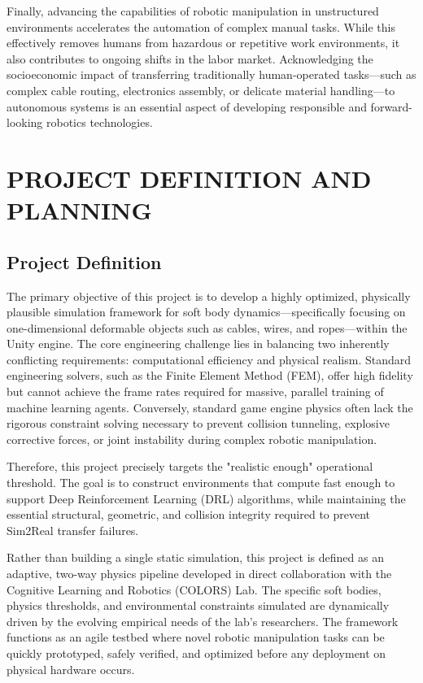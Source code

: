\documentclass[a4paper,12pt]{report}
\begin{document}
Finally, advancing the capabilities of robotic manipulation in unstructured environments accelerates the automation of complex manual tasks. While this effectively removes humans from hazardous or repetitive work environments, it also contributes to ongoing shifts in the labor market. Acknowledging the socioeconomic impact of transferring traditionally human-operated tasks—such as complex cable routing, electronics assembly, or delicate material handling—to autonomous systems is an essential aspect of developing responsible and forward-looking robotics technologies.

\chapter{PROJECT DEFINITION AND PLANNING}
\section{Project Definition}
The primary objective of this project is to develop a highly optimized, physically plausible simulation framework for soft body dynamics—specifically focusing on one-dimensional deformable objects such as cables, wires, and ropes—within the Unity engine. The core engineering challenge lies in balancing two inherently conflicting requirements: computational efficiency and physical realism. Standard engineering solvers, such as the Finite Element Method (FEM), offer high fidelity but cannot achieve the frame rates required for massive, parallel training of machine learning agents. Conversely, standard game engine physics often lack the rigorous constraint solving necessary to prevent collision tunneling, explosive corrective forces, or joint instability during complex robotic manipulation. 

Therefore, this project precisely targets the "realistic enough" operational threshold. The goal is to construct environments that compute fast enough to support Deep Reinforcement Learning (DRL) algorithms, while maintaining the essential structural, geometric, and collision integrity required to prevent Sim2Real transfer failures. 

Rather than building a single static simulation, this project is defined as an adaptive, two-way physics pipeline developed in direct collaboration with the Cognitive Learning and Robotics (COLORS) Lab. The specific soft bodies, physics thresholds, and environmental constraints simulated are dynamically driven by the evolving empirical needs of the lab's researchers. The framework functions as an agile testbed where novel robotic manipulation tasks can be quickly prototyped, safely verified, and optimized before any deployment on physical hardware occurs.
\end{document}
